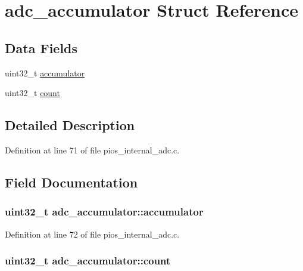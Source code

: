 \hypertarget{structadc__accumulator}{\section{adc\-\_\-accumulator \-Struct \-Reference}
\label{structadc__accumulator}
}
\subsection*{\-Data \-Fields}
\begin{DoxyCompactItemize}
\item 
uint32\-\_\-t \hyperlink{structadc__accumulator_a32c3fbd5f658b3fb0620fe5843f4f940}{accumulator}
\item 
uint32\-\_\-t \hyperlink{structadc__accumulator_a97541dd757c2f41bf9ce486d882b3cff}{count}
\end{DoxyCompactItemize}


\subsection{\-Detailed \-Description}


\-Definition at line 71 of file pios\-\_\-internal\-\_\-adc.\-c.



\subsection{\-Field \-Documentation}
\hypertarget{structadc__accumulator_a32c3fbd5f658b3fb0620fe5843f4f940}{
\subsubsection[{accumulator}]{\setlength{\rightskip}{0pt plus 5cm}uint32\-\_\-t {\bf adc\-\_\-accumulator\-::accumulator}}}\label{structadc__accumulator_a32c3fbd5f658b3fb0620fe5843f4f940}


\-Definition at line 72 of file pios\-\_\-internal\-\_\-adc.\-c.

\hypertarget{structadc__accumulator_a97541dd757c2f41bf9ce486d882b3cff}{
\subsubsection[{count}]{\setlength{\rightskip}{0pt plus 5cm}uint32\-\_\-t {\bf adc\-\_\-accumulator\-::count}}}\label{structadc__accumulator_a97541dd757c2f41bf9ce486d882b3cff}


